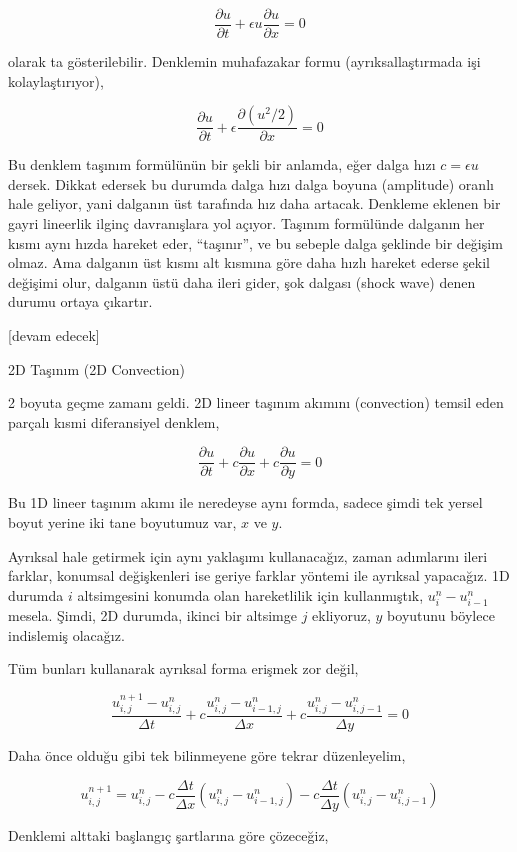 \documentclass[12pt,fleqn]{article}\usepackage{../../common}
\begin{document}
$$
\frac{\partial u}{\partial t} + \epsilon u \frac{\partial u}{\partial x} = 0
$$

olarak ta gösterilebilir. Denklemin muhafazakar formu (ayrıksallaştırmada işi
kolaylaştırıyor),

$$
\frac{\partial u}{\partial t} + \epsilon \frac{\partial (u^2 / 2)}{\partial x} = 0
$$

Bu denklem taşınım formülünün bir şekli bir anlamda, eğer dalga hızı
$c = \epsilon u$ dersek. Dikkat edersek bu durumda dalga hızı dalga boyuna
(amplitude) oranlı hale geliyor, yani dalganın üst tarafında hız daha artacak.
Denkleme eklenen bir gayri lineerlik ilginç davranışlara yol açıyor. Taşınım
formülünde dalganın her kısmı aynı hızda hareket eder, ``taşınır'', ve bu
sebeple dalga şeklinde bir değişim olmaz. Ama dalganın üst kısmı alt kısmına
göre daha hızlı hareket ederse şekil değişimi olur, dalganın üstü daha ileri
gider, şok dalgası (shock wave) denen durumu ortaya çıkartır. 

[devam edecek]

2D Taşınım (2D Convection)

2 boyuta geçme zamanı geldi. 2D lineer taşınım akımını (convection) temsil eden
parçalı kısmi diferansiyel denklem,

$$
\frac{\partial u}{\partial t} +
c\frac{\partial u}{\partial x} +
c\frac{\partial  u}{\partial y} = 0
$$

Bu 1D lineer taşınım akımı ile neredeyse aynı formda, sadece şimdi tek yersel
boyut yerine iki tane boyutumuz var, $x$ ve $y$.

Ayrıksal hale getirmek için aynı yaklaşımı kullanacağız, zaman adımlarını ileri
farklar, konumsal değişkenleri ise geriye farklar yöntemi ile ayrıksal
yapacağız. 1D durumda $i$ altsimgesini konumda olan hareketlilik için
kullanmıştık,  $u_{i}^n-u_{i-1}^n$ mesela. Şimdi, 2D durumda, ikinci bir
altsimge $j$ ekliyoruz, $y$ boyutunu böylece indislemiş olacağız.

Tüm bunları kullanarak ayrıksal forma erişmek zor değil,

$$
\frac{u_{i,j}^{n+1}-u_{i,j}^n}{\Delta t} +
c\frac{u_{i, j}^n-u_{i-1,j}^n}{\Delta x} +
c\frac{u_{i,j}^n-u_{i,j-1}^n}{\Delta y}=0
$$

Daha önce olduğu gibi tek bilinmeyene göre tekrar düzenleyelim,

$$
u_{i,j}^{n+1} =
u_{i,j}^n-c \frac{\Delta t}{\Delta x}(u_{i,j}^n-u_{i-1,j}^n) -
c \frac{\Delta t}{\Delta y}(u_{i,j}^n-u_{i,j-1}^n)
$$

Denklemi alttaki başlangıç şartlarına göre çözeceğiz,
\end{document}
